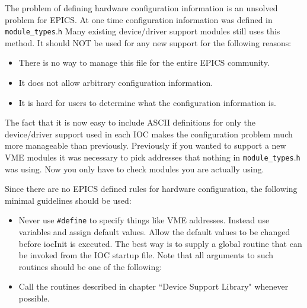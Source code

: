 The problem of defining hardware configuration information is an unsolved problem for EPICS. At one time 
configuration information was defined in \verb|module_types|.\verb|h| Many existing device/driver support modules still uses this 
method. It should NOT be used for any new support for the following reasons:

\begin{itemize}\item There is no way to manage this file for the entire EPICS community.

\item It does not allow arbitrary configuration information.

\item It is hard for users to determine what the configuration information is.

\end{itemize}The fact that it is now easy to include ASCII definitions for only the device/driver support used in each IOC makes the 
configuration problem much more manageable than previously. Previously if you wanted to support a new VME modules 
it was necessary to pick addresses that nothing in \verb|module_types|.\verb|h| was using. Now you only have to check modules 
you are actually using.

Since there are no EPICS defined rules for hardware configuration, the following minimal guidelines should be used:

\begin{itemize}

\item Never use \verb|#define| to specify things like VME addresses. Instead use variables and assign default values. Allow 
the default values to be changed before iocInit is executed. The best way is to supply a global routine that can be 
invoked from the IOC startup file. Note that all arguments to such routines should be one of the following:


\item Call the routines described in chapter ``Device Support Library" whenever possible.

\end{itemize}






